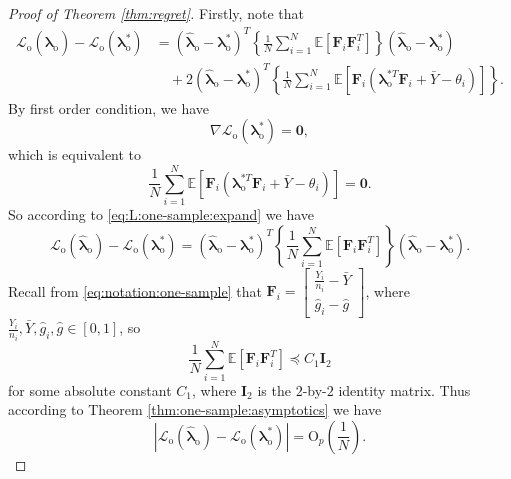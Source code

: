 \documentclass[12pt,letterpaper]{article}
\begin{document}
\begin{proof}[Proof of Theorem \ref{thm:regret}]
Firstly, note that 
\begin{equation}\label{eq:L:one-sample:expand}
\begin{array}{rl}
\mathcal{L}_{\mathrm{o}}(\hat{\boldsymbol{\lambda}}_{\mathrm{o}})-\mathcal{L}_{\mathrm{o}}(\boldsymbol{\lambda}_{\mathrm{o}}^*)\!\!\!\!&\displaystyle=(\hat{\boldsymbol{\lambda}}_{\mathrm{o}}-\boldsymbol{\lambda}_{\mathrm{o}}^*)^T\left\{\frac{1}{N}\sum_{i=1}^N\mathbb{E}\left[\mathbf{F}_i\mathbf{F}_i^T\right]\right\}(\hat{\boldsymbol{\lambda}}_{\mathrm{o}}-\boldsymbol{\lambda}_{\mathrm{o}}^*)\\
&\displaystyle\quad+2(\hat{\boldsymbol{\lambda}}_{\mathrm{o}}-\boldsymbol{\lambda}_{\mathrm{o}}^*)^T\left\{\frac{1}{N}\sum_{i=1}^N\mathbb{E}\left[\mathbf{F}_i(\boldsymbol{\lambda}_{\mathrm{o}}^{*T}\mathbf{F}_i+\bar{Y}-\theta_i)\right]\right\}.
\end{array}
\end{equation}
By first order condition, we have 
$$\nabla\mathcal{L}_{\mathrm{o}}(\boldsymbol{\lambda}_{\mathrm{o}}^*)=\mathbf{0},$$
which is equivalent to 
$$\frac{1}{N}\sum_{i=1}^N\mathbb{E}\left[\mathbf{F}_i(\boldsymbol{\lambda}_{\mathrm{o}}^{*T}\mathbf{F}_i+\bar{Y}-\theta_i)\right]=\mathbf{0}.$$
So according to \eqref{eq:L:one-sample:expand} we have 
\begin{equation}\label{eq:loss:regret:one-sample}
\mathcal{L}_{\mathrm{o}}(\hat{\boldsymbol{\lambda}}_{\mathrm{o}})-\mathcal{L}_{\mathrm{o}}(\boldsymbol{\lambda}_{\mathrm{o}}^*)=(\hat{\boldsymbol{\lambda}}_{\mathrm{o}}-\boldsymbol{\lambda}_{\mathrm{o}}^*)^T\left\{\frac{1}{N}\sum_{i=1}^N\mathbb{E}\left[\mathbf{F}_i\mathbf{F}_i^T\right]\right\}(\hat{\boldsymbol{\lambda}}_{\mathrm{o}}-\boldsymbol{\lambda}_{\mathrm{o}}^*).
\end{equation}
Recall from \eqref{eq:notation:one-sample} that $\mathbf{F}_i=\begin{bmatrix}
\displaystyle\frac{Y_i}{n_i}-\bar{Y}\\
\displaystyle\hat{g}_i-\hat{g}
\end{bmatrix}$, where $\displaystyle\frac{Y_i}{n_i},\bar{Y},\hat{g}_i,\hat{g}\in[0,1]$, so 
$$\frac{1}{N}\sum_{i=1}^N\mathbb{E}\left[\mathbf{F}_i\mathbf{F}_i^T\right]\preceq C_1\mathbf{I}_2$$ 
for some absolute constant $C_1$, where $\mathbf{I}_2$ is the $2$-by-$2$ identity matrix. Thus according to Theorem \ref{thm:one-sample:asymptotics} we have $$\left|\mathcal{L}_{\mathrm{o}}(\hat{\boldsymbol{\lambda}}_{\mathrm{o}})-\mathcal{L}_{\mathrm{o}}(\boldsymbol{\lambda}_{\mathrm{o}}^*)\right|=\mathrm{O}_{p}\left(\frac{1}{N}\right).$$

\end{proof}
\end{document}

